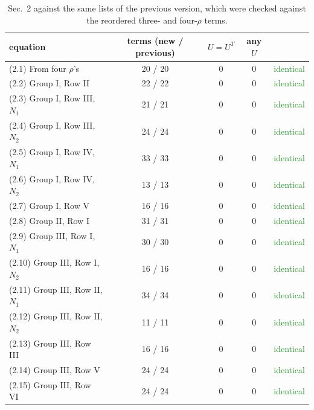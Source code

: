 \documentclass[10pt]{article}
\numberwithin{equation}{section}
\begin{document}
\begin{table}[H]\centering\small
\caption{Sec.~2 against the same lists of the previous version, which were checked against the reordered three- and four-$\rho$ terms.}\label{tab:sec2}
\begin{tabular}{@{}lcccc@{}}\toprule
equation & terms (new / previous) & $U=U^T$ & any $U$ & \\\midrule
(2.1) From four $\rho$'s & 20 / 20 & $0$ & $0$ & \textcolor{ForestGreen}{identical}\\
(2.2) Group I, Row II & 22 / 22 & $0$ & $0$ & \textcolor{ForestGreen}{identical}\\
(2.3) Group I, Row III, $N_1$ & 21 / 21 & $0$ & $0$ & \textcolor{ForestGreen}{identical}\\
(2.4) Group I, Row III, $N_2$ & 24 / 24 & $0$ & $0$ & \textcolor{ForestGreen}{identical}\\
(2.5) Group I, Row IV, $N_1$ & 33 / 33 & $0$ & $0$ & \textcolor{ForestGreen}{identical}\\
(2.6) Group I, Row IV, $N_2$ & 13 / 13 & $0$ & $0$ & \textcolor{ForestGreen}{identical}\\
(2.7) Group I, Row V & 16 / 16 & $0$ & $0$ & \textcolor{ForestGreen}{identical}\\
(2.8) Group II, Row I & 31 / 31 & $0$ & $0$ & \textcolor{ForestGreen}{identical}\\
(2.9) Group III, Row I, $N_1$ & 30 / 30 & $0$ & $0$ & \textcolor{ForestGreen}{identical}\\
(2.10) Group III, Row I, $N_2$ & 16 / 16 & $0$ & $0$ & \textcolor{ForestGreen}{identical}\\
(2.11) Group III, Row II, $N_1$ & 34 / 34 & $0$ & $0$ & \textcolor{ForestGreen}{identical}\\
(2.12) Group III, Row II, $N_2$ & 11 / 11 & $0$ & $0$ & \textcolor{ForestGreen}{identical}\\
(2.13) Group III, Row III & 16 / 16 & $0$ & $0$ & \textcolor{ForestGreen}{identical}\\
(2.14) Group III, Row V & 24 / 24 & $0$ & $0$ & \textcolor{ForestGreen}{identical}\\
(2.15) Group III, Row VI & 24 / 24 & $0$ & $0$ & \textcolor{ForestGreen}{identical}\\
\bottomrule
\end{tabular}
\end{table}
\end{document}
